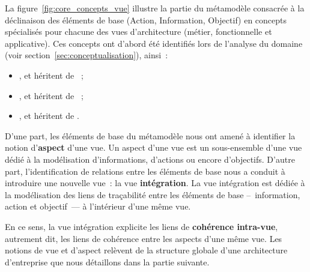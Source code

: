     La figure~\ref{fig:core_concepts_vue} illustre la partie du métamodèle consacrée 
    à la déclinaison des éléments de base (Action, Information, Objectif) en concepts spécialisés
    pour chacune des vues d'architecture (métier, fonctionnelle et applicative).
    Ces concepts ont d'abord été identifiés lors de l'analyse du domaine (voir section~\ref{sec:conceptualisation}), ainsi~:
    \begin{itemize}
    \item {},  et  héritent de ~;
    \item {},  et  héritent de ~;
    \item {},  et  héritent de .
    \end{itemize}

    D'une part, les éléments de base du métamodèle nous ont amené à identifier la notion
    d'\textbf{aspect} d'une vue. Un aspect d'une vue est un sous-ensemble d'une vue dédié à la modélisation d'informations, d'actions
    ou encore d'objectifs.
    D'autre part, l'identification de relations entre les éléments de base nous a conduit à introduire une nouvelle vue~:
    la vue \textbf{intégration}. La vue intégration est dédiée à la modélisation des liens de traçabilité entre les éléments de base
    –~information, action et objectif~— à l'intérieur d'une même vue. 

    En ce sens, la vue intégration explicite les liens de \textbf{cohérence intra-vue},
    autrement dit, les liens de cohérence entre les aspects d'une même vue.
    Les notions de vue et d'aspect relèvent de la structure globale d'une architecture d'entreprise que
    nous détaillons dans la partie suivante.

